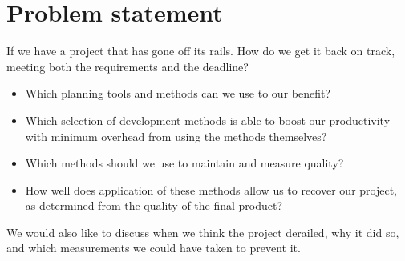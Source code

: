 \section{Problem statement}
If we have a project that has gone off its rails. How do we get it back on track, meeting both the requirements and the deadline?
\begin{itemize}
\item Which planning tools and methods can we use to our benefit?
\item Which selection of development methods is able to boost our productivity with minimum overhead from using the methods themselves?
\item Which methods should we use to maintain and measure quality?
\item How well does application of these methods allow us to recover our project, as determined from the quality of the final product?
\end{itemize}
We would also like to discuss when we think the project derailed, why it did so, and which measurements we could have taken to prevent it.
\newpage